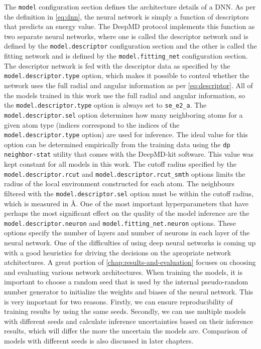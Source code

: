 The \texttt{model} configuration section defines the architecture details of
a DNN. As per the definition in \eqref{eq:dnn}, the neural network is simply a
function of descriptors that predicts an energy value. The DeepMD
protocol implements this function as two separate neural networks,
where one is called the descriptor network and is defined by the
\texttt{model.descriptor} configuration section and the other is called the
fitting network and is defined by the \texttt{model.fitting\_net}
configuration section. The descriptor network is fed with the descriptor data
as specified by the \texttt{model.descriptor.type} option, which makes it
possible to control whether the network uses the full radial and angular
information as per \eqref{eq:descriptor}. All of the models trained in this
work use the full radial and angular information, so the
\texttt{model.descriptor.type} option is always set to \texttt{se\_e2\_a}.
The \texttt{model.descriptor.sel} option determines how many neighboring atoms
for a given atom type (indices correspond to the indices of the
\texttt{model.descriptor.type} option) are used for inference. The ideal value
for this option can be determined empirically from the training data using the
\texttt{dp neighbor-stat} utility that comes with the DeepMD-kit software.
This value was kept constant for all models in this work. The cutoff radius
specified by the \texttt{model.descriptor.rcut} and
\texttt{model.descriptor.rcut\_smth} options limits the radius of the local
environment constructed for each atom. The neighbours filtered with the
\texttt{model.descriptor.sel} option must be within the cutoff radius, which
is measured in \AA. One of the most important hyperparameters that have
perhaps the most significant effect on the quality of the model inference are
the \texttt{model.descriptor.neuron} and \texttt{model.fitting\_net.neuron}
options. These options specify the number of layers and number of neurons in
each layer of the neural network. One of the difficulties of using deep neural
networks is coming up with a good heuristics for driving the decisions on the
apropriate network atchitectures. A great portion of
\autoref{chap:results-and-evaluation} focuses on choosing and evaluating
various network architectures. When training the models, it is important to
choose a random seed that is used by the internal pseudo-random number
generator to initialize the weights and biases of the neural network. This is
very important for two reasons. Firstly, we can ensure reproducibility of
training results by using the same seeds. Secondly, we can use multiple
models with different seeds and calculate inference uncertainties based on
their inference results, which will differ the more the uncertain the models
are. Comparison of models with different seeds is also discussed in later
chapters.

